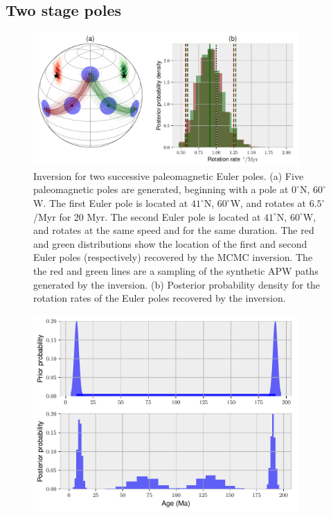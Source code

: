\documentclass[preprint,12pt,authoryear]{elsarticle}
\begin{document}
\subsection{Two stage poles}
\begin{figure}
\includegraphics[width=0.9\textwidth]{figures/synthetic/two_euler_poles.pdf}
\caption[Inversion for two successive paleomagnetic Euler poles.]{Inversion for two successive paleomagnetic Euler poles. (a) Five paleomagnetic poles are generated, beginning with a pole at $0^\circ$N, $60^\circ$W. The first Euler pole is located at $41^\circ$N, $60^\circ$W, and rotates at $6.5^\circ$/Myr for 20 Myr. The second Euler pole is located at $41^\circ$N, $60^\circ$W, and rotates at the same speed and for the same duration. The red and green distributions show the location of the first and second Euler poles (respectively) recovered by the MCMC inversion. The the red and green lines are a sampling of the synthetic APW paths generated by the inversion. (b) Posterior probability density for the rotation rates of the Euler poles recovered by the inversion.}
\label{fig:two_euler_poles}
\end{figure}
\begin{figure}
\includegraphics[width=0.9\textwidth]{figures/synthetic/age_uncertainty_samples.pdf}
\caption{}
\label{fig:age_uncertainty_samples}
\end{figure}
\end{document}
